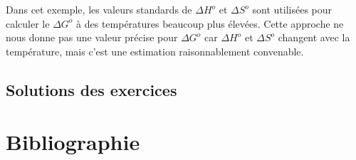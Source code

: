 \documentclass[
  11pt,
  a4paper,
  openany]{book}
\begin{document}
\begin{Answer}
Dans cet exemple, les valeurs standards de \(\Delta H^o\) et \(\Delta S^o\) sont utilisées pour calculer le \(\Delta G^o\) à des températures beaucoup plus élevées. Cette approche ne nous donne pas une valeur précise pour \(\Delta G^o\) car \(\Delta H^o\) et \(\Delta S^o\) changent avec la température, mais c'est une estimation raisonnablement convenable.

\end{Answer}

\section{Solutions des exercices} \shipoutAnswer

\chapter*{Bibliographie}\label{bibliographie}
\end{document}
